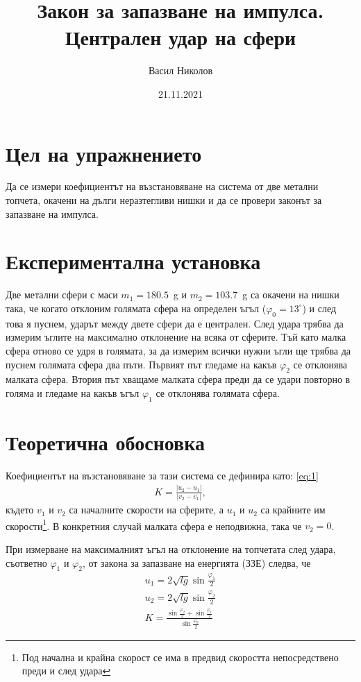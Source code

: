 \documentclass[aps, prb, twocolumn, a4paper, floatfix, reprint]{revtex4-2}
\newcommand{\degree}{^{\circ}}
\newcommand{\abs}[1]{\lvert#1\rvert}
\let\phi\varphi
\begin{document}
\title{Закон за запазване на импулса. Централен удар на сфери}
\author{Васил Николов}
\noaffiliation
\date{21.11.2021}
\maketitle

\section{Цел на упражнението}
Да се измери коефициентът на възстановяване на система от две метални топчета, окачени на дълги неразтегливи нишки и да се провери законът за запазване на импулса.


\section{Експериментална установка}
Две метални сфери с маси $m_1 = 180.5$~g и $m_2=103.7$~g са окачени на нишки така, че когато отклоним голямата сфера на определен ъгъл ($\phi_0 = 13\degree$) и след това я пуснем, ударът между двете сфери да е централен. След удара трябва да измерим ъглите на максимално отклонение на всяка от сферите. Тъй като малка сфера отново се удря в голямата, за да измерим всички нужни ъгли ще трябва да пуснем голямата сфера два пъти. Първият път гледаме на какъв $\phi_{2}$ се отклонява малката сфера. Втория път хващаме малката сфера преди да се удари повторно в голяма и гледаме на какъв ъгъл $\phi_{1}$ се отклонява голямата сфера.


\section{Теоретична обосновка}
Коефициентът на възстановяване за тази система се дефинира като: \eqref{eq:1}
\begin{gather*}
    K=\frac{\abs{u_2 - u_1}}{\abs{v_2 - v_1}},
\end{gather*}
където $v_1$ и $v_2$ са началните скорости на сферите, а $u_1$ и $u_2$ са крайните им скорости\footnote{Под начална и крайна скорост се има в предвид скоростта непосредствено преди и след удара}. В конкретния случай малката сфера е неподвижна, така че $v_{2} = 0$.

При измерване на максималният ъгъл на отклонение на топчетата след удара, съответно $\phi_1$ и $\phi_2$, от закона за запазване на енергията (ЗЗЕ) следва, че
\begin{gather}
    u_1 = 2\sqrt{lg}\sin\frac{\phi_1}{2} \nonumber\\
    u_2 = 2\sqrt{lg}\sin\frac{\phi_2}{2} \nonumber\\
    K   = \frac{\sin\frac{\phi_2}{2} + \sin\frac{\phi_1}{2}}{\sin\frac{\phi_0}{2}} \label{eq:1}
\end{gather}
\end{document}
